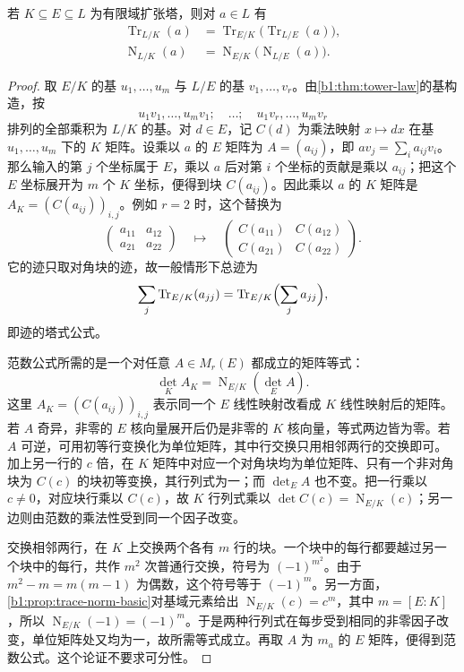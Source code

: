 \begin{theorem}\label{b1:thm:trace-norm-tower}
	若 \(K\subseteq E\subseteq L\) 为有限域扩张塔，则对 \(a\in L\) 有
	\begin{align*}
		\operatorname{Tr}_{L/K}(a)&=\operatorname{Tr}_{E/K}\bigl(\operatorname{Tr}_{L/E}(a)\bigr),\\
		\operatorname{N}_{L/K}(a)&=\operatorname{N}_{E/K}\bigl(\operatorname{N}_{L/E}(a)\bigr).
	\end{align*}
\end{theorem}
\begin{proof}
	取 \(E/K\) 的基 \(u_1,\ldots,u_m\) 与 \(L/E\) 的基 \(v_1,\ldots,v_r\)。由\cref{b1:thm:tower-law}的基构造，按
	\[
		u_1v_1,\ldots,u_mv_1;\quad\ldots;\quad u_1v_r,\ldots,u_mv_r
	\]
	排列的全部乘积为 \(L/K\) 的基。对 \(d\in E\)，记 \(C(d)\) 为乘法映射 \(x\mapsto dx\) 在基 \(u_1,\ldots,u_m\) 下的 \(K\) 矩阵。设乘以 \(a\) 的 \(E\) 矩阵为 \(A=(a_{ij})\)，即 \(av_j=\sum_i a_{ij}v_i\)。那么输入的第 \(j\) 个坐标属于 \(E\)，乘以 \(a\) 后对第 \(i\) 个坐标的贡献是乘以 \(a_{ij}\)；把这个 \(E\) 坐标展开为 \(m\) 个 \(K\) 坐标，便得到块 \(C(a_{ij})\)。因此乘以 \(a\) 的 \(K\) 矩阵是 \(A_K=(C(a_{ij}))_{i,j}\)。例如 \(r=2\) 时，这个替换为
	\[
		\begin{pmatrix}a_{11}&a_{12}\\a_{21}&a_{22}\end{pmatrix}
		\quad\longmapsto\quad
		\begin{pmatrix}C(a_{11})&C(a_{12})\\C(a_{21})&C(a_{22})\end{pmatrix}.
	\]
	它的迹只取对角块的迹，故一般情形下总迹为
	\[
		\sum_j\operatorname{Tr}_{E/K}(a_{jj}) =\operatorname{Tr}_{E/K}\Bigl(\sum_j a_{jj}\Bigr),
	\]
	即迹的塔式公式。

	范数公式所需的是一个对任意 \(A\in M_r(E)\) 都成立的矩阵等式：
	\[
		\det_K A_K=\operatorname{N}_{E/K}(\det_E A).
	\]
	这里 \(A_K=(C(a_{ij}))_{i,j}\) 表示同一个 \(E\) 线性映射改看成 \(K\) 线性映射后的矩阵。若 \(A\) 奇异，非零的 \(E\) 核向量展开后仍是非零的 \(K\) 核向量，等式两边皆为零。若 \(A\) 可逆，可用初等行变换化为单位矩阵，其中行交换只用相邻两行的交换即可。加上另一行的 \(c\) 倍，在 \(K\) 矩阵中对应一个对角块均为单位矩阵、只有一个非对角块为 \(C(c)\) 的块初等变换，其行列式为一；而 \(\det_E A\) 也不变。把一行乘以 \(c\ne0\)，对应块行乘以 \(C(c)\)，故 \(K\) 行列式乘以 \(\det C(c)=\operatorname{N}_{E/K}(c)\)；另一边则由范数的乘法性受到同一个因子改变。

	交换相邻两行，在 \(K\) 上交换两个各有 \(m\) 行的块。一个块中的每行都要越过另一个块中的每行，共作 \(m^2\) 次普通行交换，符号为 \((-1)^{m^2}\)。由于 \(m^2-m=m(m-1)\) 为偶数，这个符号等于 \((-1)^m\)。另一方面，\cref{b1:prop:trace-norm-basic}对基域元素给出 \(\operatorname{N}_{E/K}(c)=c^m\)，其中 \(m=[E:K]\)，所以 \(\operatorname{N}_{E/K}(-1)=(-1)^m\)。于是两种行列式在每步受到相同的非零因子改变，单位矩阵处又均为一，故所需等式成立。再取 \(A\) 为 \(m_a\) 的 \(E\) 矩阵，便得到范数公式。这个论证不要求可分性。
\end{proof}

